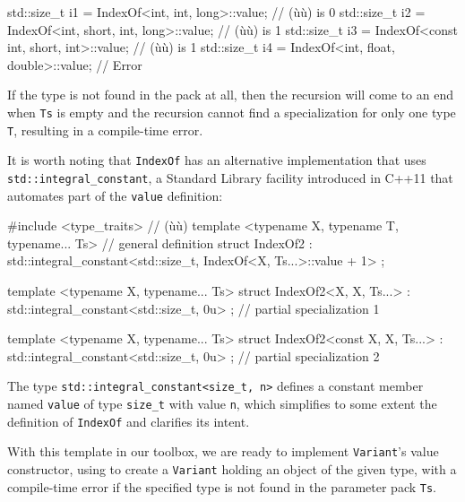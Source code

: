 \begin{emcppslisting}[emcppsbatch={e38,e39}]
std::size_t i1 = IndexOf<int, int, long>::value;         // (ù{}ù) is 0
std::size_t i2 = IndexOf<int, short, int, long>::value;  // (ù{}ù) is 1
std::size_t i3 = IndexOf<const int, short, int>::value;  // (ù{}ù) is 1
std::size_t i4 = IndexOf<int, float, double>::value;     // Error
\end{emcppslisting}
    

\noindent If the type is not found in the pack at all, then the recursion will
come to an end when \lstinline!Ts! is empty and the recursion cannot find a
specialization for only one type \lstinline!T!, resulting in a compile-time
error.

It is worth noting that \lstinline!IndexOf! has an alternative
implementation that uses\linebreak%
 \lstinline!std::integral_constant!, a Standard
Library facility introduced in C++11 that automates part of the
\lstinline!value! definition:

\begin{emcppslisting}[emcppsbatch={e38,e39}]
#include <type_traits>  // (ù{}ù)
template <typename X, typename T, typename... Ts>  // general definition
struct IndexOf2
    : std::integral_constant<std::size_t, IndexOf<X, Ts...>::value + 1> {};

template <typename X, typename... Ts>
struct IndexOf2<X, X, Ts...>
    : std::integral_constant<std::size_t, 0u> {};  // partial specialization 1

template <typename X, typename... Ts>
struct IndexOf2<const X, X, Ts...>
    : std::integral_constant<std::size_t, 0u> {};  // partial specialization 2
\end{emcppslisting}
    

\noindent The type \lstinline!std::integral_constant<size_t,!~\lstinline!n>! defines a
constant member named \lstinline!value! of type \lstinline!size_t! with value
\lstinline!n!, which simplifies to some extent the definition of
\lstinline!IndexOf! and clarifies its intent.

With this template in our toolbox, we are ready to implement
\lstinline!Variant!'s value constructor, using 
to create a \lstinline!Variant! holding an object of the given type, with a
compile-time error if the specified type is not found in the parameter
pack \lstinline!Ts!.

